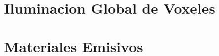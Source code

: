

\section{Iluminacion Global de Voxeles} %
\label{sec:iluminacion_global_de_voxeles}


\section{Materiales Emisivos} %
\label{sec:materiales_emisivos}

